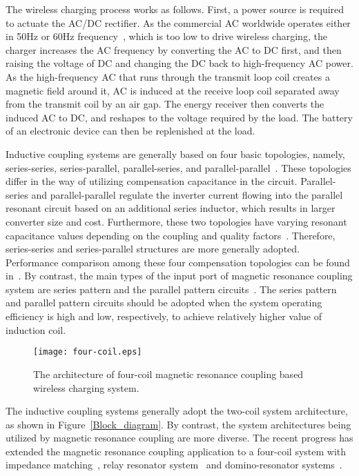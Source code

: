 \documentclass[twocolumn,10pt]{IEEEtran}
\begin{document}
The wireless charging process works as follows. First, a power source is required to actuate the AC/DC rectifier. As the commercial AC worldwide operates either in 50Hz or 60Hz frequency~\cite{R.2014Kurtus}, which is too low to drive wireless charging, the charger increases the AC frequency by converting the AC to DC first, and then raising the voltage of DC and changing the DC back to high-frequency AC power. As the high-frequency AC that runs through the transmit loop coil creates a magnetic field around it, AC is induced at the receive loop coil separated away from the transmit coil by an air gap. The energy receiver then converts the induced AC to DC, and reshapes to the voltage required by the load. The battery of an electronic device can then be replenished at the load.      

Inductive coupling systems are generally based on four basic topologies, namely, series-series, series-parallel, parallel-series, and parallel-parallel~\cite{J.2010Moradewicz}. These topologies differ in the way of utilizing compensation capacitance in the circuit. Parallel-series and parallel-parallel regulate the inverter current flowing into the parallel resonant circuit based on an additional series inductor, which results in larger converter size and cost. Furthermore, these two topologies have varying resonant capacitance values depending on the coupling and quality factors~\cite{J.2010Moradewicz}. Therefore, series-series and series-parallel structures are more generally adopted. Performance comparison among these four compensation topologies can be found in~\cite{N.2013Jamal}. By contrast, the main types of the input port of magnetic resonance coupling system are series pattern and the parallel pattern circuits~\cite{M.2013Yang}. The series pattern and parallel pattern circuits should be adopted when the system operating efficiency is high and low, respectively, to achieve relatively higher value of induction coil.

\begin{figure}
\centering
\texttt{[image: four-coil.eps]}
\caption{The architecture of four-coil magnetic resonance coupling based wireless charging system.} \label{four-coil}
\end{figure}

The inductive coupling systems generally adopt the two-coil system architecture, as shown in Figure~\ref{Block_diagram}. By contrast, the system architectures being utilized by magnetic resonance coupling are more diverse. The recent progress has extended the magnetic resonance coupling application to a four-coil system with impedance matching~\cite{J.2010Chen,P.2011Duong}, relay resonator system~\cite{X.2012Zhang,F.2011Zhang} and domino-resonator systems~\cite{X.2012Zhong,K.2012Lee,W.2013Zhong}.   
\end{document}
